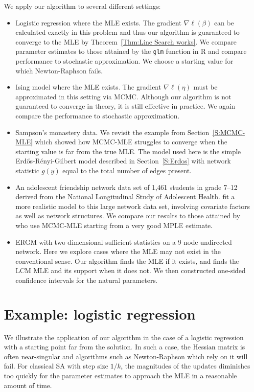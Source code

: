 We apply our algorithm to several different settings:
\begin{itemize}
\item Logistic regression where the MLE exists.  The gradient $\nabla \ell(\beta)$ can be calculated exactly in this problem and thus our algorithm is guaranteed to converge to
the MLE by Theorem~\ref{Thm:Line Search works}.  We compare parameter estimates to those attained by the \texttt{glm} function in R and compare performance to stochastic approximation.  We choose a starting value for which Newton-Raphson fails.

\item Ising model where the MLE exists.  The gradient $\nabla \ell(\eta)$ must be approximated in this setting via MCMC.  Although our algorithm is not guaranteed to converge in theory, it is still effective in practice.  We again compare the performance to stochastic approximation.

\item Sampson's monastery data.  We revisit the example from Section~\ref{S:MCMC-MLE} which
showed how MCMC-MLE struggles to converge when the starting value is far
from the true MLE.  The model used here is the simple Erd\H{o}s-R\'{e}nyi-Gilbert model 
described in Section~\ref{S:Erdos} with network statistic $g(y)$ equal to the total number of edges present.

\item An adolescent friendship network data set of 1,461 students in grade 7--12 derived 
from the National Longitudinal Study of Adolescent Health.  \citet{statnet-tutorial}
fit a more realistic model to this large network data set, involving covariate
factors as well as network structures.  We compare our results to those attained by
\citeauthor{statnet-tutorial} who use MCMC-MLE starting from a very good MPLE estimate.

\item ERGM with two-dimensional sufficient statistics on a 9-node undirected network.  
Here we explore cases where the MLE may not exist in the conventional sense.  
Our algorithm finds the MLE if it exists, and finds the LCM MLE and its support when 
it does not.  We then constructed one-sided confidence intervals for the natural parameters.
\end{itemize}

\section{Example: logistic regression} \label{S:Example:logistic}
We illustrate the application of our algorithm in the case of a logistic regression 
with a starting point far from the 
solution.  In such a case, the Hessian matrix is often near-singular and algorithms 
such as Newton-Raphson which rely 
on it will fail.  For classical SA with step size $1/k$, the magnitudes of the updates 
diminishes too quickly for 
the parameter estimates to approach the MLE in a reasonable amount of time.

